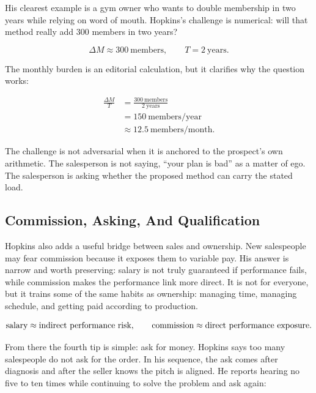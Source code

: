 \documentclass[11pt,oneside]{book}
\begin{document}
His clearest example is a gym owner who wants to double membership in two years while relying on word of mouth. Hopkins's challenge is numerical: will that method really add \(300\) members in two years?

\begin{equation}
\Delta M \approx 300\ \mathrm{members},
\qquad
T = 2\ \mathrm{years}.
\end{equation}

The monthly burden is an editorial calculation, but it clarifies why the question works:

\begin{align}
\frac{\Delta M}{T}
&=
\frac{300\ \mathrm{members}}{2\ \mathrm{years}}  \\
&=
150\ \mathrm{members/year} \\
&\approx
12.5\ \mathrm{members/month}.
\end{align}

The challenge is not adversarial when it is anchored to the prospect's own arithmetic. The salesperson is not saying, ``your plan is bad'' as a matter of ego. The salesperson is asking whether the proposed method can carry the stated load.

\subsection{Commission, Asking, And Qualification}

Hopkins also adds a useful bridge between sales and ownership. New salespeople may fear commission because it exposes them to variable pay. His answer is narrow and worth preserving: salary is not truly guaranteed if performance fails, while commission makes the performance link more direct. It is not for everyone, but it trains some of the same habits as ownership: managing time, managing schedule, and getting paid according to production.

\begin{equation}
\hbox{salary} \approx \hbox{indirect performance risk},
\qquad
\hbox{commission} \approx \hbox{direct performance exposure}.
\end{equation}

From there the fourth tip is simple: ask for money. Hopkins says too many salespeople do not ask for the order. In his sequence, the ask comes after diagnosis and after the seller knows the pitch is aligned. He reports hearing no five to ten times while continuing to solve the problem and ask again:
\end{document}
